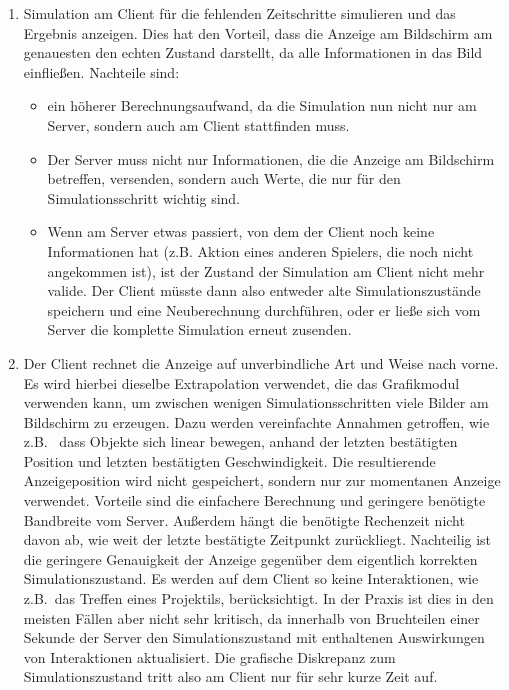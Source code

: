 \begin{enumerate}
\item Simulation am Client für die fehlenden Zeitschritte simulieren und das Ergebnis anzeigen. Dies hat den Vorteil, dass die Anzeige am Bildschirm am genauesten den echten Zustand darstellt, da alle Informationen in das Bild einfließen. Nachteile sind:
\begin{itemize}
 \item ein höherer Berechnungsaufwand, da die Simulation nun nicht nur am Server, sondern auch am Client stattfinden muss. 
 \item Der Server muss nicht nur Informationen, die die Anzeige am Bildschirm betreffen, versenden, sondern auch Werte, die nur für den Simulationsschritt wichtig sind.
 \item Wenn am Server etwas passiert, von dem der Client noch keine Informationen hat (z.B. Aktion eines anderen Spielers, die noch nicht angekommen ist), ist der Zustand der Simulation am Client nicht mehr valide. Der Client müsste dann also entweder alte Simulationszustände speichern und eine Neuberechnung durchführen, oder er ließe sich vom Server die komplette Simulation erneut zusenden.
\end{itemize}
\item Der Client rechnet die Anzeige auf unverbindliche Art und Weise nach vorne. Es wird hierbei dieselbe Extrapolation verwendet, die das Grafikmodul verwenden kann, um zwischen wenigen Simulationsschritten viele Bilder am Bildschirm zu erzeugen. Dazu werden vereinfachte Annahmen getroffen, wie z.B.~ dass Objekte sich linear bewegen, anhand der letzten bestätigten Position und letzten bestätigten Geschwindigkeit. Die resultierende Anzeigeposition wird nicht gespeichert, sondern nur zur momentanen Anzeige verwendet.
Vorteile sind die einfachere Berechnung und geringere benötigte Bandbreite vom Server. Außerdem hängt die benötigte Rechenzeit nicht davon ab, wie weit der letzte bestätigte Zeitpunkt zurückliegt. 
Nachteilig ist die geringere Genauigkeit der Anzeige gegenüber dem eigentlich korrekten Simulationszustand. Es werden auf dem Client so keine Interaktionen, wie z.B.~das Treffen eines Projektils, berücksichtigt. 
In der Praxis ist dies in den meisten Fällen aber nicht sehr kritisch, da innerhalb von Bruchteilen einer Sekunde der Server den Simulationszustand mit enthaltenen Auswirkungen von Interaktionen aktualisiert. Die grafische Diskrepanz zum Simulationszustand tritt also am Client nur für sehr kurze Zeit auf.\\
\end{enumerate}
